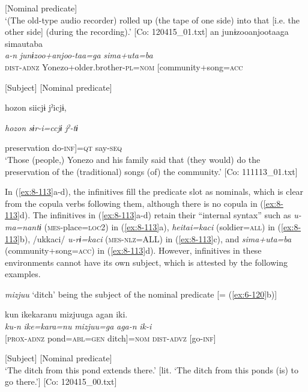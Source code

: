       [Nominal predicate]\\
\glt ‘(The old-type audio recorder) rolled up (the tape of one side) into that [i.e. the other side] (during the recording).’ [Co: 120415\_01.txt]
\ex
{\TM}
\glll  an  junɨzooanjootaaga  simautaba\\
\textit{a-n}  \textit{junɨzoo+anjoo-taa=ga}  \textit{sima+uta=ba}\\
\textsc{dist}-\textsc{adnz}  Yonezo+older.brother-\textsc{pl}=\textsc{nom}  [community+song=\textsc{acc}

      [Subject]  [Nominal predicate]

      {\textbar}hozon{\textbar}  siicjɨ  jˀicjɨ,

      \textit{hozon}  \textit{sɨr-i=ccjɨ}  \textit{jˀ-tɨ}

      preservation  do-\textsc{inf}]=\textsc{qt}  say-\textsc{seq}\\
\glt ‘Those (people,) Yonezo and his family said that (they would) do the preservation of the (traditional) songs (of) the community.’ [Co: 111113\_01.txt]
\z
\z

In (\ref{ex:8-113}a-d), the infinitives fill the predicate slot as nominals, which is clear from the copula verbs following them, although there is no copula in (\ref{ex:8-113}d). The infinitives in (\ref{ex:8-113}a-d) retain their “internal syntax” \citep{Haspelmath1996} such as \textit{u-ma=nantɨ} (\textsc{mes}-place=\textsc{loc}2) in (\ref{ex:8-113}a), \textit{heitai=kaci} (soldier=\textsc{all}) in (\ref{ex:8-113}b), /ukkaci/ \textit{u-rɨ=kaci} (\textsc{mes}-\textsc{nlz}=ALL) in (\ref{ex:8-113}c), and \textit{sima+uta=ba} (community+song=\textsc{acc}) in (\ref{ex:8-113}d). However, infinitives in these environments cannot have its own subject, which is attested by the following examples.

\ea\label{ex:8-114}
\ea \textit{mizjuu} ‘ditch’ being the subject of the nominal predicate [= (\ref{ex:6-120}b)]

  {\TM}
\glll  kun  {\textbar}ike{\textbar}karanu  mizjuuga  agan  iki.\\
\textit{ku-n}  \textit{ike=kara=nu}  \textit{mizjuu=ga}  \textit{aga-n}  \textit{ik-i}\\

    [\textsc{prox}-\textsc{adnz}  pond=\textsc{abl}=\textsc{gen}  ditch]=\textsc{nom}  \textsc{dist}-\textsc{advz}  [go-\textsc{inf}]

    [Subject]    [Nominal predicate]\\
\glt ‘The ditch from this pond extends there.’ [lit. ‘The ditch from this ponds (is) to go there.’]
    [Co: 120415\_00.txt]



